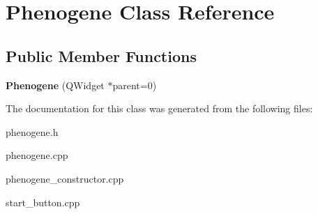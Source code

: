 \hypertarget{classPhenogene}{\section{Phenogene Class Reference}
\label{classPhenogene}
}
\subsection*{Public Member Functions}
\begin{DoxyCompactItemize}
\item 
\hypertarget{classPhenogene_a0bf8df2f283892e0bfca337db621e231}{{\bfseries Phenogene} (Q\-Widget $\ast$parent=0)}\label{classPhenogene_a0bf8df2f283892e0bfca337db621e231}

\end{DoxyCompactItemize}


The documentation for this class was generated from the following files\-:\begin{DoxyCompactItemize}
\item 
phenogene.\-h\item 
phenogene.\-cpp\item 
phenogene\-\_\-constructor.\-cpp\item 
start\-\_\-button.\-cpp\end{DoxyCompactItemize}
